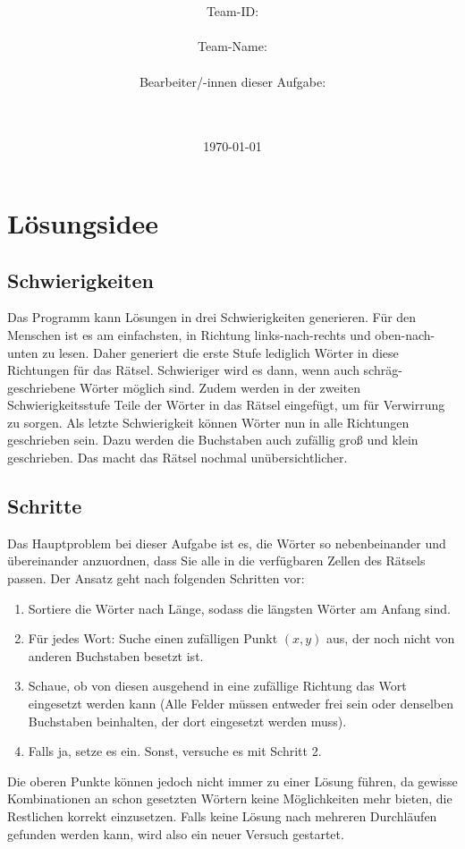 \documentclass[a4paper,10pt,ngerman]{scrartcl}
\title{\textbf{\Huge\Aufgabe}}
\author{\LARGE Team-ID: \LARGE \TeamId \\\\
	    \LARGE Team-Name: \LARGE \TeamName \\\\
	    \LARGE Bearbeiter/-innen dieser Aufgabe: \\ 
	    \LARGE \Namen\\\\}
\date{\LARGE\today}
\begin{document}
\maketitle
\tableofcontents

\vspace{0.5cm}

\section{Lösungsidee}
\subsection{Schwierigkeiten}
Das Programm kann Lösungen in drei Schwierigkeiten generieren.
Für den Menschen ist es am einfachsten, in Richtung links-nach-rechts und oben-nach-unten zu lesen.
Daher generiert die erste Stufe lediglich Wörter in diese Richtungen für das Rätsel.
Schwieriger wird es dann, wenn auch schräg-geschriebene Wörter möglich sind. Zudem werden in der
zweiten Schwierigkeitsstufe Teile der Wörter in das Rätsel eingefügt, um für Verwirrung zu sorgen.
Als letzte Schwierigkeit können Wörter nun in alle Richtungen geschrieben sein. Dazu werden
die Buchstaben auch zufällig groß und klein geschrieben. Das macht das Rätsel nochmal unübersichtlicher. 
\subsection{Schritte}
Das Hauptproblem bei dieser Aufgabe ist es, die Wörter so nebenbeinander und übereinander anzuordnen, dass
Sie alle in die verfügbaren Zellen des Rätsels passen. Der Ansatz geht nach folgenden Schritten vor:
\begin{enumerate}
	\item Sortiere die Wörter nach Länge, sodass die längsten Wörter am Anfang sind.
	\item Für jedes Wort: Suche einen zufälligen Punkt $(x, y)$ aus, der noch nicht von anderen Buchstaben besetzt ist.
	\item Schaue, ob von diesen ausgehend in eine zufällige Richtung das Wort eingesetzt werden kann (Alle Felder müssen entweder frei sein oder denselben Buchstaben beinhalten, der dort eingesetzt werden muss).
	\item Falls ja, setze es ein. Sonst, versuche es mit Schritt 2.
\end{enumerate}
Die oberen Punkte können jedoch nicht immer zu einer Lösung führen, da gewisse Kombinationen an schon
gesetzten Wörtern keine Möglichkeiten mehr bieten, die Restlichen korrekt einzusetzen.
Falls keine Lösung nach mehreren Durchläufen gefunden werden kann, wird also ein neuer Versuch gestartet.
\end{document}
